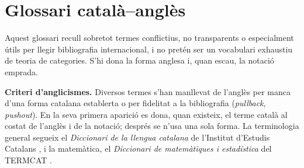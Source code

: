 \chapter*{Glossari català--anglès}

Aquest glossari recull sobretot termes conflictius, no transparents o especialment útils per llegir bibliografia internacional, i no pretén ser un vocabulari exhaustiu de teoria de categories. S'hi dona la forma anglesa i, quan escau, la notació emprada.

\medskip
\noindent\textbf{Criteri d'anglicismes.} Diversos termes s'han manllevat de l'anglès per manca d'una forma catalana establerta o per fidelitat a la bibliografia (\emph{pullback}, \emph{pushout}). En la seva primera aparició es dona, quan existeix, el terme català al costat de l'anglès i de la notació; després se n'usa una sola forma. La terminologia general segueix el \emph{Diccionari de la llengua catalana} de l'Institut d'Estudis Catalans \cite{diec}, i la matemàtica, el \emph{Diccionari de matemàtiques i estadística} del TERMCAT \cite{termcat}.

\medskip

